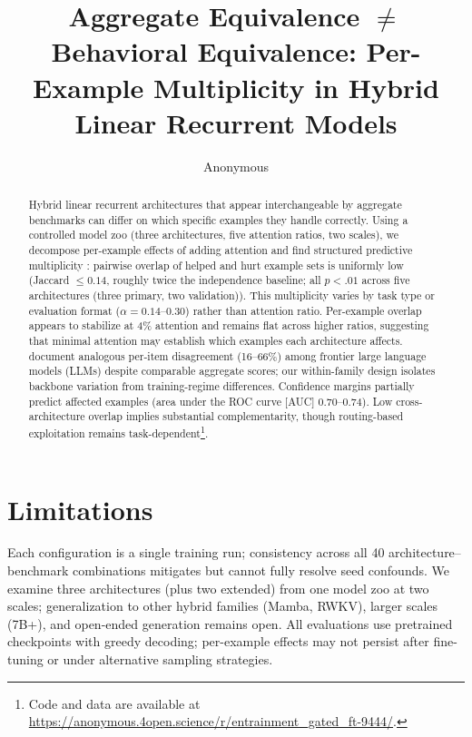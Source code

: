\documentclass[11pt]{article}
\title{Aggregate Equivalence $\neq$ Behavioral Equivalence: Per-Example Multiplicity in Hybrid Linear Recurrent Models}
\author{Anonymous}
\begin{document}
\maketitle

\begin{abstract}
Hybrid linear recurrent architectures that appear interchangeable by aggregate benchmarks can differ on which specific examples they handle correctly. Using a controlled model zoo \citep{wang2025hybrid} (three architectures, five attention ratios, two scales), we decompose per-example effects of adding attention and find structured predictive multiplicity \citep{marx2020predictive}: pairwise overlap of helped and hurt example sets is uniformly low (Jaccard $\leq 0.14$, roughly twice the independence baseline; all $p < .01$ across five architectures (three primary, two validation)). This multiplicity varies by task type or evaluation format ($\alpha = 0.14$--$0.30$) rather than attention ratio. Per-example overlap appears to stabilize at 4\% attention and remains flat across higher ratios, suggesting that minimal attention may establish which examples each architecture affects. \citet{yang2026benchmark} document analogous per-item disagreement (16--66\%) among frontier large language models (LLMs) despite comparable aggregate scores; our within-family design isolates backbone variation from training-regime differences. Confidence margins partially predict affected examples (area under the ROC curve [AUC] 0.70--0.74). Low cross-architecture overlap implies substantial complementarity, though routing-based exploitation remains task-dependent\footnote{Code and data are available at \url{https://anonymous.4open.science/r/entrainment_gated_ft-9444/}.}.
\end{abstract}











\section*{Limitations}

Each configuration is a single training run; consistency across all 40 architecture--benchmark combinations mitigates but cannot fully resolve seed confounds.
We examine three architectures (plus two extended) from one model zoo at two scales; generalization to other hybrid families (Mamba, RWKV), larger scales (7B+), and open-ended generation remains open.
All evaluations use pretrained checkpoints with greedy decoding; per-example effects may not persist after fine-tuning or under alternative sampling strategies.



\appendix

\end{document}
